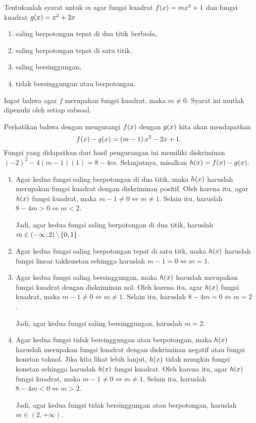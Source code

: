 		\begin{contoh}
			Tentukanlah syarat untuk $ m $ agar fungsi kuadrat $ \mathop{}\!{f}{\left({x}\right)} = mx^{2} + 1 $ dan fungsi kuadrat $ \mathop{}\!{g}{\left({x}\right)} = x^{2} + 2x $
			\begin{enumerate}
				\item saling berpotongan tepat di dua titik berbeda,
				\item saling berpotongan tepat di satu titik,
				\item saling bersinggungan,
				\item tidak bersinggungan atau berpotongan.
			\end{enumerate}
		\end{contoh}
		\begin{jawab}
			Ingat bahwa agar $ f $ merupakan fungsi kuadrat, maka $ m \ne 0 $. Syarat ini mutlak dipenuhi oleh setiap subsoal.
			\par Perhatikan bahwa dengan mengurangi $ \mathop{}\!{f}{\left({x}\right)} $ dengan $ \mathop{}\!{g}{\left({x}\right)} $ kita akan mendapatkan
			\[ \mathop{}\!{f}{\left({x}\right)} - \mathop{}\!{g}{\left({x}\right)} = \left(m - 1\right)x^{2} - 2x + 1. \]
			Fungsi yang didapatkan dari hasil pengurangan ini memiliki diskriminan $ \left(-2\right)^{2} - 4\left(m - 1\right)\left(1\right) = 8 - 4m $. Selanjutnya, misalkan $ \mathop{}\!{h}{\left({x}\right)} = \mathop{}\!{f}{\left({x}\right)} - \mathop{}\!{g}{\left({x}\right)} $.
			\begin{enumerate}
				\item Agar kedua fungsi saling berpotongan di dua titik, maka $ \mathop{}\!{h}{\left({x}\right)} $ haruslah merupakan fungsi kuadrat dengan diskriminan positif. Oleh karena itu, agar $ \mathop{}\!{h}{\left({x}\right)} $ fungsi kuadrat, maka $ m - 1 \ne 0 \iff m \ne 1 $. Selain itu, haruslah $ 8 - 4m > 0 \iff m < 2 $.
				\par Jadi, agar kedua fungsi saling berpotongan di dua titik, haruslah $ m \in \left(-\infty, 2\right) \backslash \mathop{}\!\left\lbrace0, 1\right\rbrace $.
				\item Agar kedua fungsi saling berpotongan tepat di satu titk, maka $ \mathop{}\!{h}{\left({x}\right)} $ haruslah fungsi linear takkonstan sehingga haruslah $ m - 1 = 0 \iff m = 1 $.
				\item Agar kedua fungsi saling bersinggungan, maka $ \mathop{}\!{h}{\left({x}\right)} $ haruslah merupakan fungsi kuadrat dengan diskriminan nol. Oleh karena itu, agar $ \mathop{}\!{h}{\left({x}\right)} $ fungsi kuadrat, maka $ m - 1 \ne 0 \iff m \ne 1 $. Selain itu, haruslah $ 8 - 4m = 0 \iff m = 2 $.
				\par Jadi, agar kedua fungsi saling bersinggungan, haruslah $ m = 2 $.
				\item Agar kedua fungsi tidak bersinggungan atau berpotongan, maka $ \mathop{}\!{h}{\left({x}\right)} $ haruslah merupakan fungsi kuadrat dengan diskriminan negatif atau fungsi konstan taknol. Jika kita lihat lebih lanjut, $ \mathop{}\!{h}{\left({x}\right)} $ tidak mungkin fungsi konstan sehingga haruslah $ \mathop{}\!{h}{\left({x}\right)} $ fungsi kuadrat. Oleh karena itu, agar $ \mathop{}\!{h}{\left({x}\right)} $ fungsi kuadrat, maka $ m - 1 \ne 0 \iff m \ne 1 $. Selain itu, haruslah $ 8 - 4m < 0 \iff m > 2 $.
				\par Jadi, agar kedua fungsi tidak bersinggungan atau berpotongan, haruslah $ m \in \left(2, +\infty\right) $.
			\end{enumerate}
		\end{jawab}
		
